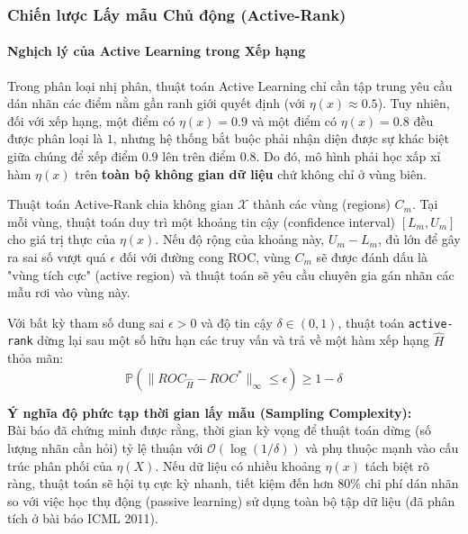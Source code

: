 \subsubsection{Chiến lược Lấy mẫu Chủ động (Active-Rank)}
\paragraph{Nghịch lý của Active Learning trong Xếp hạng}
Trong phân loại nhị phân, thuật toán Active Learning chỉ cần tập trung yêu cầu dán nhãn các điểm nằm gần ranh giới quyết định (với $\eta(x) \approx 0.5$). Tuy nhiên, đối với xếp hạng, một điểm có $\eta(x) = 0.9$ và một điểm có $\eta(x) = 0.8$ đều được phân loại là $1$, nhưng hệ thống bắt buộc phải nhận diện được sự khác biệt giữa chúng để xếp điểm $0.9$ lên trên điểm $0.8$. Do đó, mô hình phải học xấp xỉ hàm $\eta(x)$ trên \textbf{toàn bộ không gian dữ liệu} chứ không chỉ ở vùng biên.

\begin{bo_de}
  \label{active_partition}
  Thuật toán Active-Rank chia không gian $\mathcal{X}$ thành các vùng (regions) $C_m$. Tại mỗi vùng, thuật toán duy trì một khoảng tin cậy (confidence interval) $[L_m, U_m]$ cho giá trị thực của $\eta(x)$. Nếu độ rộng của khoảng này, $U_m - L_m$, đủ lớn để gây ra sai số vượt quá $\epsilon$ đối với đường cong ROC, vùng $C_m$ sẽ được đánh dấu là "vùng tích cực" (active region) và thuật toán sẽ yêu cầu chuyên gia gán nhãn các mẫu rơi vào vùng này.
\end{bo_de}

\begin{dinh_ly}
  \label{thm_pac_active_rank}
  Với bất kỳ tham số dung sai $\epsilon > 0$ và độ tin cậy $\delta \in (0,1)$, thuật toán \texttt{active-rank} dừng lại sau một số hữu hạn các truy vấn và trả về một hàm xếp hạng $\hat{H}$ thỏa mãn:
  \begin{equation}
    \mathbb{P} \left( \| ROC_{\hat{H}} - ROC^* \|_{\infty} \le \epsilon \right) \ge 1 - \delta
  \end{equation}
\end{dinh_ly}

\begin{nhan_xet_box}
  \textbf{Ý nghĩa độ phức tạp thời gian lấy mẫu (Sampling Complexity):} \\
  Bài báo đã chứng minh được rằng, thời gian kỳ vọng để thuật toán dừng (số lượng nhãn cần hỏi) tỷ lệ thuận với $\mathcal{O}\left( \log(1/\delta) \right)$ và phụ thuộc mạnh vào cấu trúc phân phối của $\eta(X)$. Nếu dữ liệu có nhiều khoảng $\eta(x)$ tách biệt rõ ràng, thuật toán sẽ hội tụ cực kỳ nhanh, tiết kiệm đến hơn $80\%$ chi phí dán nhãn so với việc học thụ động (passive learning) sử dụng toàn bộ tập dữ liệu (đã phân tích ở bài báo ICML 2011).
\end{nhan_xet_box}

